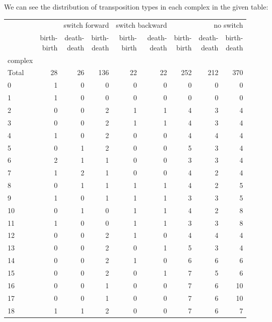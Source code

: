 \documentclass{article}
\begin{document}
\par We can see the distribution of transposition types in each complex in the given table:
\begin{center}
\begin{tabular}{lrrrrrrrr}
\toprule
& \multicolumn{3}{r}{switch forward} & \multicolumn{2}{r}{switch backward} & \multicolumn{3}{r}{no switch} \\
& \makecell{birth-\\birth} & \makecell{death-\\death} & \makecell{birth-\\death} & \makecell{birth-\\birth} & \makecell{death-\\death} & \makecell{birth-\\birth} & \makecell{death-\\death} & \makecell{birth-\\death} \\
complex &  &  &  &  &  &  &  &  \\
\midrule
Total & 28 & 26 & 136 & 22 & 22 & 252 & 212 & 370 \\
0 & 1 & 0 & 0 & 0 & 0 & 0 & 0 & 0 \\
1 & 1 & 0 & 0 & 0 & 0 & 0 & 0 & 0 \\
2 & 0 & 0 & 2 & 1 & 1 & 4 & 3 & 4 \\
3 & 0 & 0 & 2 & 1 & 1 & 4 & 3 & 4 \\
4 & 1 & 0 & 2 & 0 & 0 & 4 & 4 & 4 \\
5 & 0 & 1 & 2 & 0 & 0 & 5 & 3 & 4 \\
6 & 2 & 1 & 1 & 0 & 0 & 3 & 3 & 4 \\
7 & 1 & 2 & 1 & 0 & 0 & 4 & 2 & 4 \\
8 & 0 & 1 & 1 & 1 & 1 & 4 & 2 & 5 \\
9 & 1 & 0 & 1 & 1 & 1 & 3 & 3 & 5 \\
10 & 0 & 1 & 0 & 1 & 1 & 4 & 2 & 8 \\
11 & 1 & 0 & 0 & 1 & 1 & 3 & 3 & 8 \\
12 & 0 & 0 & 2 & 1 & 0 & 4 & 4 & 4 \\
13 & 0 & 0 & 2 & 0 & 1 & 5 & 3 & 4 \\
14 & 0 & 0 & 2 & 1 & 0 & 6 & 6 & 6 \\
15 & 0 & 0 & 2 & 0 & 1 & 7 & 5 & 6 \\
16 & 0 & 0 & 1 & 0 & 0 & 7 & 6 & 10 \\
17 & 0 & 0 & 1 & 0 & 0 & 7 & 6 & 10 \\
18 & 1 & 1 & 2 & 0 & 0 & 7 & 6 & 7 \\

\end{tabular}
\end{center}
\end{document}
